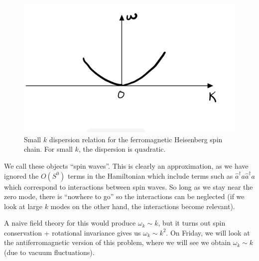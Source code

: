 \begin{figure}[htbp]
    \centering
    \includegraphics[scale=0.4]{Lectures/Figures/FM_spin_dispersion.png}
    \caption{Small $k$ dispersion relation for the ferromagnetic Heisenberg spin chain. For small $k$, the dispersion is quadratic.}
    \label{fig:FM_spin_dispersion}
\end{figure}

We call these objects ``spin waves''. This is clearly an approximation, as we have ignored the $O(S^0)$ terms in the Hamiltonian which include terms such as $\hat{a}^\dag a \hat{a}^\dag a$ which correspond to interactions between spin waves. So long as we stay near the zero mode, there is ``nowhere to go'' so the interactions can be neglected (if we look at large $k$ modes on the other hand, the interactions become relevant). 

A naive field theory for this would produce $\omega_k \sim k$, but it turns out spin conservation + rotational invariance gives us $\omega_k \sim k^2$. On Friday, we will look at the antiferromagnetic version of this problem, where we will see we obtain $\omega_k \sim k$ (due to vacuum fluctuations).
